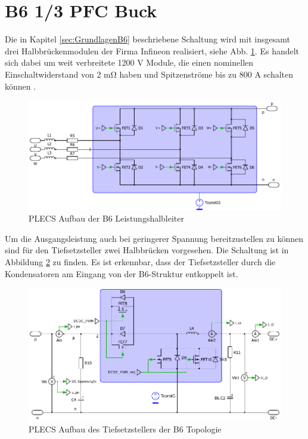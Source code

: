 \section{B6 1/3 PFC Buck}
Die in Kapitel \ref{sec:GrundlagenB6} beschriebene Schaltung wird mit insgesamt drei Halbbrückenmodulen der Firma Infineon realisiert, siehe Abb. \ref{fig:plecsb6}. Es handelt sich dabei um weit verbreitete 1200 \si{\volt} Module, die einen nominellen Einschaltwiderstand von 2 \si{\milli \ohm} haben und Spitzenströme bis zu 800 \si{\ampere} schalten können \cite{IFAGFF2}.
\begin{figure}[H]
	\centering
	\includegraphics[width=0.9\linewidth]{content/Grafiken/PLECS_B6}
	\caption{PLECS Aufbau der B6 Leistungshalbleiter}
	\label{fig:plecsb6}
\end{figure}
 Um die Ausgangsleistung auch bei geringerer Spannung bereitzustellen zu können sind für den Tiefsetzsteller zwei Halbbrücken vorgesehen. Die Schaltung ist in Abbildung \ref{fig:plecsb6buck} zu finden. Es ist erkennbar, dass der Tiefsetzsteller durch die Kondensatoren am Eingang von der B6-Struktur entkoppelt ist.
 \begin{figure}[H]
 	\centering
 	\includegraphics[width=0.9\linewidth]{content/Grafiken/PLECS_B6Buck}
 	\caption{PLECS Aufbau des Tiefsetzstellers der B6 Topologie}
 	\label{fig:plecsb6buck}
 \end{figure}
 

